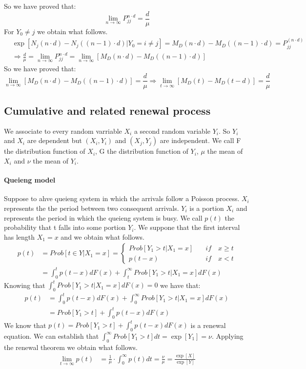 So we have proved that:
\begin{equation}
	\lim_{n \to \infty} P_{jj}^{n \cdot d}=\frac{d}{\mu}
\end{equation}
For $Y_0 \neq j$ we obtain what follows.
\begin{align*}
	& \exp[N_j(n \cdot d)-N_j((n-1) \cdot d)|Y_0=i \neq j]=M_D(n \cdot d)-M_D((n-1) \cdot d)=P_{jj}^{(n \cdot d)}
	\\ & \Rightarrow \frac{d}{\mu}=\lim_{n \to \infty} P_{jj}^{n \cdot d} = \lim_{n \to \infty} [M_D(n \cdot d)-M_D((n-1) \cdot d)]
\end{align*}
So we have proved that:
\begin{equation}
	\lim_{n \to \infty} [M_D(n \cdot d)-M_D((n-1) \cdot d)]=\frac{d}{\mu} \Rightarrow \lim_{t \to \infty }[M_D(t)-M_D(t-d)]=\frac{d}{\mu}
\end{equation}

\subsection{Cumulative and related renewal process}
We associate to every random varriable $X_i$ a second random variable $Y_i$. So $Y_i$ and $X_i$ are dependent but $(X_i,Y_i)$ and $(X_j,Y_j)$ are independent. We call F the distribution function of $X_i$, G the distribution function of $Y_i$, $\mu$ the mean of $X_i$ and $\nu$ the mean of $Y_i$.
\paragraph{Queieng model}
Suppose to ahve queieng system in which the arrivals follow a Poisson process. $X_i$ represents the the period between two consequent arrivals. $Y_i$ is a portion $X_i$ and represents the period in which the queieng system is busy. We call $p(t)$ the probability that t falls into some portion $Y_i$. We suppone that the first interval has length $X_1=x$ and we obtain what follows.
\begin{align*}
	p(t) & =Prob[t \in Y |X_1 = x]=\begin{cases}
		Prob[Y_1>t|X_1=x] \quad & if \quad x \geq t
		\\ p(t-x) \quad & if \quad x<t
	\end{cases}
	\\ & = \int_0^t p(t-x)dF(x)+\int_t^{\infty}Prob[Y_1>t|X_1=x]dF(x)
\end{align*}
Knowing that $\int_0^{t}Prob[Y_1>t|X_1=x]dF(x)=0$ we have that:
\begin{align*}
	p(t) & = \int_0^t p(t-x)dF(x)+\int_0^{\infty}Prob[Y_1>t|X_1=x]dF(x)
	\\ & = Prob[Y_1>t]+\int_0^t p(t-x)dF(x)
\end{align*}
We know that $p(t)= Prob[Y_1>t]+\int_0^t p(t-x)dF(x)$ is a renewal equation. We can establish that $\int_0^{\infty}Prob[Y_1>t]dt=\exp[Y_1]=\nu$. Applying the renewal theorem we obtain what follows.
\begin{align*}
	\lim_{t \to \infty} p(t) & = \frac{1}{\mu}\cdot\int_0^{\infty}p(t)dt = \frac{\nu}{\mu}= \frac{\exp[X]}{\exp[Y]}
\end{align*}

